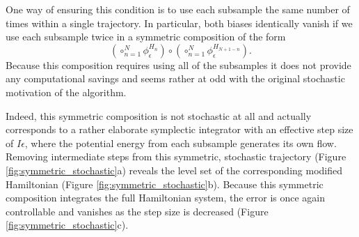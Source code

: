 \documentclass{article}
\begin{document}
One way of ensuring this condition is to use each subsample the same number
of times within a single trajectory.  In particular, both biases identically vanish if 
we use each subsample twice in a symmetric composition of the form
%
\begin{equation*}
\left( \circ_{n = 1}^{N} \phi^{H_{n}}_{\epsilon} \right)
\circ 
\left( \circ_{n = 1}^{N} \phi^{H_{N + 1 - n}}_{\epsilon} \right).
\end{equation*}
%
Because this composition requires using all of the subsamples it does not provide
any computational savings and seems rather at odd with the original stochastic 
motivation of the algorithm. 

Indeed, this symmetric composition is not stochastic at all and actually corresponds 
to a rather elaborate symplectic integrator with an effective step size of $I \epsilon$, 
where the potential energy from each subsample generates its own flow.  Removing 
intermediate steps from this symmetric, stochastic trajectory 
(Figure \ref{fig:symmetric_stochastic}a) reveals the level set of the corresponding
modified Hamiltonian (Figure \ref{fig:symmetric_stochastic}b).  Because this
symmetric composition integrates the full Hamiltonian system, the error is 
once again controllable and vanishes as the step size is decreased
(Figure \ref{fig:symmetric_stochastic}c).
\end{document}
